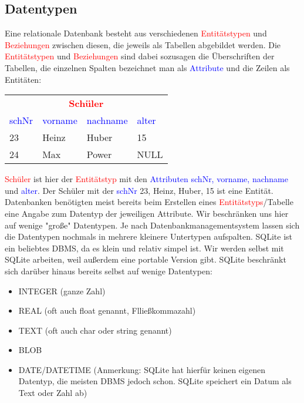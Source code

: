\subsection{Datentypen}
Eine relationale Datenbank besteht aus verschiedenen \textcolor{red}{Entitätstypen} und \textcolor{red}{Beziehungen} zwischen diesen, die jeweils als Tabellen abgebildet werden. Die \textcolor{red}{Entitätstypen} und \textcolor{red}{Beziehungen} sind dabei sozusagen die Überschriften der Tabellen, die einzelnen Spalten bezeichnet man als \textcolor{blue}{Attribute} und die Zeilen als Entitäten:\\
\begin{table}[h]
	\centering
	\begin{tabular}{llll}
		\multicolumn{4}{c}{\textcolor{red}{\textbf{Schüler}}}\\
		\textcolor{blue}{schNr} 	& \textcolor{blue}{vorname} 	& \textcolor{blue}{nachname}	& \textcolor{blue}{alter}  \\
		\midrule
		23&Heinz&Huber&15\\
		24&Max&Power&NULL\\
	\end{tabular}
\end{table}
\textcolor{red}{Schüler} ist hier der \textcolor{red}{Entitätstyp} mit den \textcolor{blue}{Attributen schNr, vorname, nachname} und \textcolor{blue}{alter}. Der Schüler mit der \textcolor{blue}{schNr} 23, Heinz, Huber, 15 ist eine Entität.
Datenbanken benötigten meist bereits beim Erstellen eines \textcolor{red}{Entitätstyps}/Tabelle eine Angabe zum Datentyp der jeweiligen Attribute. Wir beschränken uns hier auf wenige "große" Datentypen. Je nach Datenbankmanagementsystem lassen sich die Datentypen nochmals in mehrere kleinere Untertypen aufspalten.
SQLite ist ein beliebtes DBMS, da es klein und relativ simpel ist. Wir werden selbst mit SQLite arbeiten, weil außerdem eine portable Version gibt. SQLite beschränkt sich darüber hinaus bereits selbst auf wenige Datentypen:
\begin{tcolorbox}[title=Datentypen]
	\begin{itemize}
		\item INTEGER (ganze Zahl)
		\item REAL (oft auch float genannt, Flließkommazahl)
		\item TEXT (oft auch char oder string genannt)
		\item BLOB
		\item DATE/DATETIME (Anmerkung: SQLite hat hierfür keinen eigenen Datentyp, die meisten DBMS jedoch schon. SQLite speichert ein Datum als Text oder Zahl ab)
	\end{itemize}
\end{tcolorbox}


